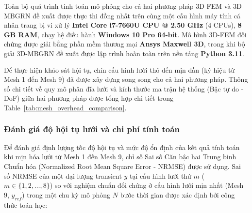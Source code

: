 Toàn bộ quá trình tính toán mô phỏng cho cả hai phương pháp 3D-FEM và 3D-MBGRN đề xuất được thực thi đồng nhất trên cùng một cấu hình máy tính cá nhân trang bị vi xử lý \textbf{Intel Core i7-7660U CPU @ 2.50 GHz} (4 CPUs), \textbf{8 GB RAM}, chạy hệ điều hành \textbf{Windows 10 Pro 64-bit}. Mô hình 3D-FEM đối chứng được giải bằng phần mềm thương mại \textbf{Ansys Maxwell 3D}, trong khi bộ giải 3D-MBGRN đề xuất được lập trình hoàn toàn trên nền tảng \textbf{Python 3.11}.

Để thực hiện khảo sát hội tụ, chín cấu hình lưới thô đến mịn dần (ký hiệu từ Mesh 1 đến Mesh 9) đã được xây dựng song song cho cả hai phương pháp. Thông số chi tiết về quy mô phân đĩa lưới và kích thước ma trận hệ thống (Bậc tự do - DoF) giữa hai phương pháp được tổng hợp chi tiết trong Table~\ref{tab:mesh_overhead_comparison}.

\begin{table}[htbp]
\caption{Thông số phân đĩa lưới và kích thước ma trận của 3D-FEM và 3D-MBGRN trên 9 cấu hình lưới}
\label{tab:mesh_overhead_comparison}
\centering
{}
\end{table}

\subsubsection{Đánh giá độ hội tụ lưới và chi phí tính toán}
Để đánh giá định lượng tốc độ hội tụ và mức độ ổn định của kết quả tính toán khi mịn hóa lưới từ Mesh 1 đến Mesh 9, chỉ số Sai số Căn bậc hai Trung bình Chuẩn hóa (Normalized Root Mean Square Error - NRMSE) được sử dụng. Sai số NRMSE của một đại lượng transient $y$ tại cấu hình lưới thứ $m$ ($m \in \{1, 2, \dots, 8\}$) so với nghiệm chuẩn đối chứng ở cấu hình lưới mịn nhất (Mesh 9, $y_{ref}$) trong một chu kỳ mô phỏng $N$ bước thời gian được xác định bởi công thức toán học:

